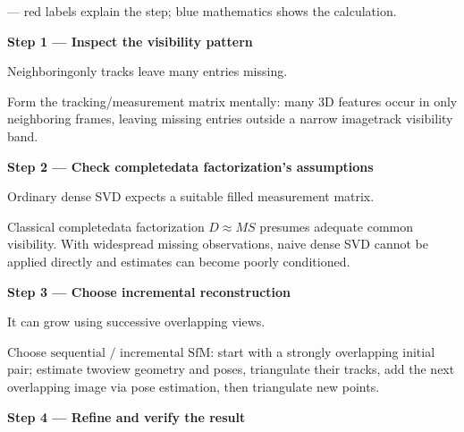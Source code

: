 \documentclass[letterpaper,11pt,english,openany,oneside]{jupyterBook}
\begin{document}
\sphinxAtStartPar
{} — red labels explain the step; blue mathematics shows the calculation.

\par\medskip{}
{\color{QuizStepRed}\bfseries Step 1 — Inspect the visibility pattern}\par\smallskip

\sphinxAtStartPar
{} Neighboring\sphinxhyphen{}only tracks leave many entries missing.

\sphinxAtStartPar
Form the tracking/measurement matrix mentally: many 3D features occur in only neighboring frames, leaving missing entries outside a narrow image\sphinxhyphen{}track visibility band.

\par

\par\medskip{}
{\color{QuizStepRed}\bfseries Step 2 — Check complete\sphinxhyphen{}data factorization's assumptions}\par\smallskip

\sphinxAtStartPar
{} Ordinary dense SVD expects a suitable filled measurement matrix.

\sphinxAtStartPar
Classical complete\sphinxhyphen{}data factorization {\color{QuizMathBlue} \(D\approx MS\)} presumes adequate common visibility. With widespread missing observations, naive dense SVD cannot be applied directly and estimates can become poorly conditioned.

\par

\par\medskip{}
{\color{QuizStepRed}\bfseries Step 3 — Choose incremental reconstruction}\par\smallskip

\sphinxAtStartPar
{} It can grow using successive overlapping views.

\sphinxAtStartPar
Choose {\color{QuizMathBlue} \(\boxed{\text{sequential / incremental SfM}}\)}: start with a strongly overlapping initial pair; estimate two\sphinxhyphen{}view geometry and poses, triangulate their tracks, add the next overlapping image via pose estimation, then triangulate new points.

\par

\par\medskip{}
{\color{QuizStepRed}\bfseries Step 4 — Refine and verify the result}\par\smallskip
\end{document}
